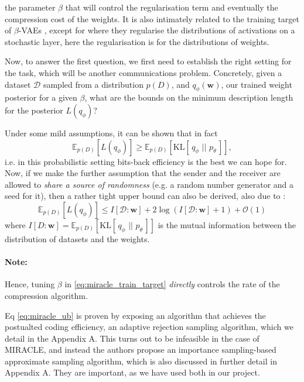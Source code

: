 \documentclass{article}
\renewcommand{\vec}[1]{\mathbf{#1}}
\newcommand{\Oh}{\mathcal{O}}
\newcommand{\KL}[2]{\mathrm{KL}[\,#1\,\,||\,\,#2\,]}
\newcommand{\Exp}{\mathbb{E}}
\newcommand{\Data}{\mathcal{D}}
\begin{document}
the parameter $\beta$ that will control the regularisation term and eventually
the compression cost of the weights. It is also intimately related to the
training target of $\beta$-VAEs \cite{higgins2017beta}, except for where they
regularise the distributions of activations on a stochastic layer, here the
regularisation is for the distributions of weights. 
\par
Now, to answer the first question, we first need to establish the right setting
for the task, which will be another communications problem.
Concretely, given a dataset $\Data$ sampled from a distribution $p(D)$, and
$q_\phi(\vec{w})$, our trained weight posterior for a given $\beta$, what are
the bounds on the minimum description length for the posterior $L(q_{\phi})$?
\par
Under some mild assumptions, it can be shown \cite{harsha2007communication} that
in fact
\[
  \Exp_{p(D)}[L(q_{\phi})] \geq \Exp_{p(D)}[\KL{q_{\phi}}{p_{\theta}}],
\]
i.e. in this probabilistic setting bits-back efficiency is the best we can hope
for. Now, if we make the further assumption that the sender and the receiver are
allowed to \textit{share a source of randomness} (e.g. a random number generator
and a seed for it), then a rather tight upper bound can also be derived, also
due to \cite{harsha2007communication}:
\begin{equation}
\label{eq:miracle_ub}
  \Exp_{p(D)}[L(q_{\phi})] \leq I[\Data : \vec{w}] + 2 \log \left( I[\Data :
    \vec{w}] + 1 \right) + \Oh(1)
\end{equation}
where $I[D : \vec{w}] = \Exp_{p(D)}[\KL{q_{\phi}}{p_{\theta}}]$ is the
mutual information between the distribution of datasets and the weights.
\paragraph{Note:} Hence, tuning $\beta$ in \ref{eq:miracle_train_target}
\textit{directly} controls the rate of the compression algorithm.
\par
Eq \ref{eq:miracle_ub} is proven by exposing an algorithm that achieves the
postualted coding efficiency, an adaptive rejection sampling algorithm, which we
detail in the Appendix A. This turns out to be infeasible in the case of
MIRACLE, and instead the authors propose an importance sampling-based
approximate sampling algorithm, which is also discussed in further detail in
Appendix A. They are important, as we have used both in our project.
\end{document}
